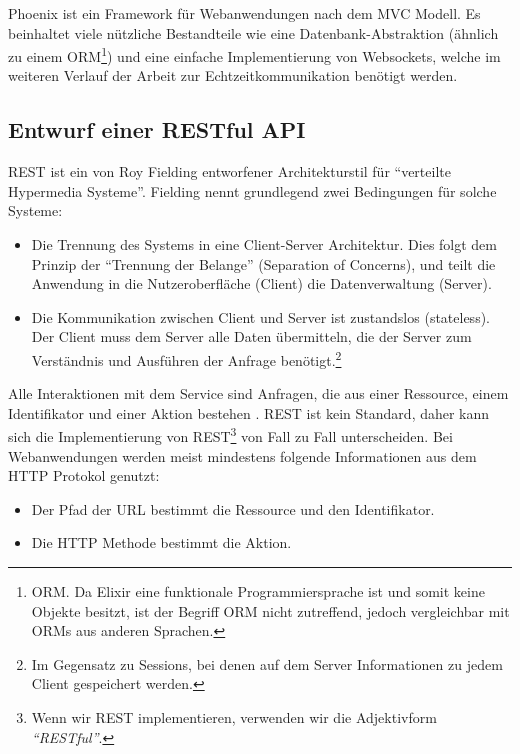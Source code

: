 Phoenix ist ein Framework für Webanwendungen nach dem \ac{MVC} Modell. Es beinhaltet viele nützliche Bestandteile wie eine Datenbank-Abstraktion (ähnlich zu einem \acs{ORM}\footnote{\acf{ORM}. Da Elixir eine funktionale Programmiersprache ist und somit keine Objekte besitzt, ist der Begriff \acs{ORM} nicht zutreffend, jedoch vergleichbar mit ORMs aus anderen Sprachen.}) und eine einfache Implementierung von Websockets, welche im weiteren Verlauf der Arbeit zur Echtzeitkommunikation benötigt werden.

\subsection{Entwurf einer RESTful API}

\ac{REST} ist ein von Roy Fielding entworfener Architekturstil für ``verteilte Hypermedia Systeme''. Fielding nennt grundlegend zwei Bedingungen für solche Systeme:

\begin{itemize}
  \item Die Trennung des Systems in eine Client-Server Architektur. Dies folgt dem Prinzip der ``Trennung der Belange'' (Separation of Concerns), und teilt die Anwendung in die Nutzeroberfläche (Client) die Datenverwaltung (Server).
  \item Die Kommunikation zwischen Client und Server ist zustandslos (stateless). Der Client muss dem Server alle Daten übermitteln, die der Server zum Verständnis und Ausführen der Anfrage benötigt.\footnote{Im Gegensatz zu Sessions, bei denen auf dem Server Informationen zu jedem Client gespeichert werden.}
\end{itemize}

Alle Interaktionen mit dem Service sind Anfragen, die aus einer Ressource, einem Identifikator und einer Aktion bestehen \citep[12]{Webber2010}. \ac{REST} ist kein Standard, daher kann sich die Implementierung von \ac{REST}\footnote{Wenn wir REST implementieren, verwenden wir die Adjektivform \emph{``RESTful''}.} von Fall zu Fall unterscheiden. Bei Webanwendungen werden meist mindestens folgende Informationen aus dem \ac{HTTP} Protokol genutzt:

\begin{itemize}
  \item Der Pfad der \acs{URL} bestimmt die Ressource und den Identifikator.
  \item Die \ac{HTTP} Methode bestimmt die Aktion.
\end{itemize}


